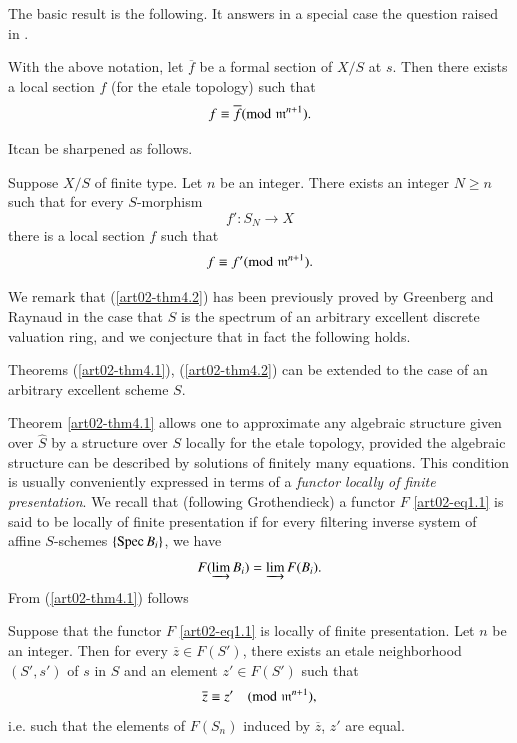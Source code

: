 The basic result is the following. It answers in a special case the question raised in \cite{art02-key3}.

\begin{theorem}\label{art02-thm4.1}
With the above notation, let $\overline{f}$ be a formal section of $X/S$ at $s$. Then there exists a local section $f$ (for the etale topology) such that
$$
f\equiv \overline{f}({\rm{mod}}\kern.3em \mathfrak{m}^{n+1}).
$$
\end{theorem}

It\pageoriginale can be sharpened as follows.

\begin{theorem}\label{art02-thm4.2}
Suppose $X/S$ of finite type. Let $n$ be an integer. There exists an integer $N\geq n$ such that for every $S$-morphism
$$
f':S_{N}\to X
$$
there is a local section $f$ such that
$$
f\equiv f'({\rm{mod}}\kern.3em \mathfrak{m}^{n+1}).
$$
\end{theorem}

We remark that (\ref{art02-thm4.2}) has been previously proved by Greenberg \cite{art02-key10} and Raynaud in the case that $S$ is the spectrum of an arbitrary excellent discrete valuation ring, and we conjecture that in fact the following holds.

\begin{conjecture}\label{art02-conj4.3}
Theorems (\ref{art02-thm4.1}), (\ref{art02-thm4.2}) can be extended to the case of an arbitrary excellent scheme $S$.
\end{conjecture}

Theorem \ref{art02-thm4.1} allows one to approximate any algebraic structure given over $\widehat{S}$ by a structure over $S$ locally for the etale topology, provided the algebraic structure can be described by solutions of finitely many equations. This condition is usually conveniently expressed in terms of a {\em functor locally of finite presentation}. We recall that (following Grothendieck) a functor $F$ \eqref{art02-eq1.1} is said to be locally of finite presentation if for every filtering inverse system of affine $S$-schemes $\{\operatorname{\mathrm{Spec}} B_{i}\}$, we have
\setcounter{equation}{3}
\begin{equation}
F(\varinjlim B_{i})=\varinjlim F(B_{i}).\label{art02-eq4.4}
\end{equation}
From (\ref{art02-thm4.1}) follows

\setcounter{theorem}{4}
\begin{theorem}\label{art02-thm4.5}
Suppose that the functor $F$ \eqref{art02-eq1.1} is locally of finite presentation. Let $n$ be an integer. Then for every $\overline{z}\in F(S')$, there exists an etale neighborhood $(S',s')$ of $s$ in $S$ and an element $z'\in F(S')$ such that
$$
\overline{z}\equiv z'\quad ({\rm{mod}}\kern.3em \mathfrak{m}^{n+1}),
$$
i.e. such that the elements of $F(S_{n})$ induced by $\overline{z}$, $z'$ are equal.
\end{theorem}

